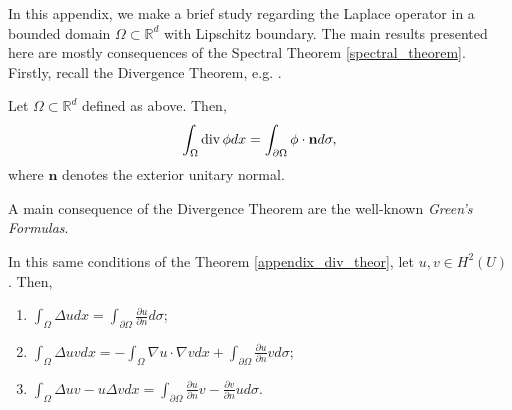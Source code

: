

In this appendix, we make a brief study regarding the Laplace operator in a bounded domain \(\Omega \subset \mathbb{R}^d\) with Lipschitz boundary. The main results presented here are mostly consequences of the Spectral Theorem \ref{spectral_theorem}. Firstly, recall the Divergence Theorem, e.g. \cite{evans2015measure}.
\begin{theorem}\label{appendix_div_theor}
    Let \(\Omega \subset \mathbb{R}^d\) defined as above. Then,
    \[
      \int_\Omega \operatorname{div} \phi dx = \int_{\partial\Omega} \phi \cdot \mathbf{n} d\sigma,
    \]
    where \(\mathbf{n}\) denotes the exterior unitary normal.
\end{theorem}
A main consequence of the Divergence Theorem are the well-known \textit{Green's Formulas}.
\begin{corollary}
    In this same conditions of the Theorem \ref{appendix_div_theor}, let \(u, v \in H^2(U)\). Then,
    \begin{enumerate}
        \item \(\int_\Omega \Delta u dx = \int_{\partial \Omega} \frac{\partial u}{\partial n} d\sigma\);
        \item \(\int_\Omega \Delta u v dx = -\int_\Omega \nabla u \cdot \nabla v dx + \int_{\partial \Omega} \frac{\partial u}{\partial n}v d\sigma\);
        \item \(\int_\Omega \Delta u v - u \Delta v dx= \int_{\partial \Omega} \frac{\partial u}{\partial n}v - \frac{\partial v}{\partial n}u d\sigma\).
    \end{enumerate}
\end{corollary}

